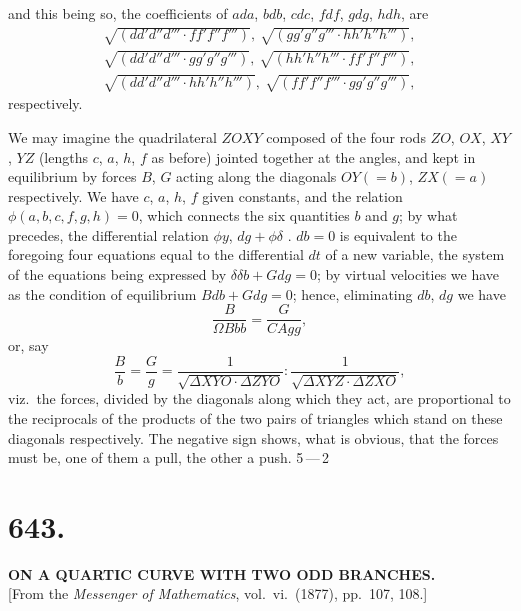 \documentclass[11pt,a4paper]{article}
\begin{document}
and this being so, the coefficients of $ada$, $bdb$, $cdc$, $fdf$, $gdg$, $hdh$, are
\begin{align*}
\sqrt{(dd'd''d''' \cdot ff'f''f''')},\ \sqrt{(gg'g''g'''\cdot hh'h''h''')},\\
\sqrt{(dd'd''d''' \cdot gg'g''g''')},\ \sqrt{(hh'h''h''' \cdot ff'f''f''')},\\
\sqrt{(dd'd''d''' \cdot hh'h''h''')},\ \sqrt{(ff'f''f''' \cdot gg'g''g''')},
\end{align*}
respectively.

We may imagine the quadrilateral $ZOXY$ composed of the four rods $ZO$, $OX$, $XY$, $YZ$ (lengths $c$, $a$, $h$, $f$ as before) jointed together at the angles, and kept in equilibrium by forces $B$, $G$ acting along the diagonals $OY (= b)$, $ZX (= a)$ respectively. We have $c$, $a$, $h$, $f$ given constants, and the relation $\phi(a, b, c, f, g, h) = 0$, which connects the six quantities $b$ and $g$; by what precedes, the differential relation $\phi y$, $dg + \phi \delta$ . $db = 0$ is equivalent to the foregoing four equations equal to the differential $dt$ of a new variable, the system of the equations being expressed by $\delta \delta b + Gdg = 0$; by virtual velocities we have as the condition of equilibrium $B db + G dg = 0$; hence, eliminating $db$, $dg$ we have
\[
\frac{B}{\Omega B b b} = \frac{G}{C A g g},
\]
or, say
\[
\frac{B}{b} = \frac{G}{g} = \frac{1}{\sqrt{\Delta X Y O \cdot \Delta Z Y O}} : \frac{1}{\sqrt{\Delta X Y Z \cdot \Delta Z X O}},
\]
viz.\ the forces, divided by the diagonals along which they act, are proportional to the reciprocals of the products of the two pairs of triangles which stand on these diagonals respectively. The negative sign shows, what is obvious, that the forces must be, one of them a pull, the other a push.
\hfill 5\,---\,2

\bigskip


\section*{643.}

\begin{center}
\textbf{ON A QUARTIC CURVE WITH TWO ODD BRANCHES.}\\[1em]
[From the \textit{Messenger of Mathematics}, vol.~vi.\ (1877), pp.\ 107, 108.]
\end{center}
\end{document}
